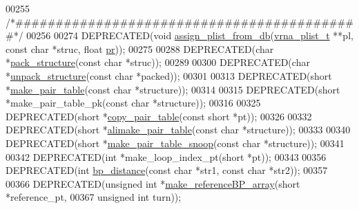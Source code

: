 \begin{DoxyCode}
00255 \textcolor{comment}{/*###########################################*/}
00256 
00274 DEPRECATED(\textcolor{keywordtype}{void} \hyperlink{group__struct__utils_ga6f3031d77de925a7b4ca72e1d52dec2f}{assign\_plist\_from\_db}(\hyperlink{group__data__structures_structvrna__plist__s}{vrna\_plist\_t} **pl, \textcolor{keyword}{const} \textcolor{keywordtype}{char} *struc, \textcolor{keywordtype}{
      float} \hyperlink{fold__vars_8h_ac98ec419070aee6831b44e5c700f090f}{pr}));
00275 
00288 DEPRECATED(\textcolor{keywordtype}{char} *\hyperlink{group__struct__utils_gac6dfa5e22928c087c6e09ff0054a7ced}{pack\_structure}(\textcolor{keyword}{const} \textcolor{keywordtype}{char} *struc));
00289 
00300 DEPRECATED(\textcolor{keywordtype}{char} *\hyperlink{group__struct__utils_ga071c6921efe1eb974f115ee6fefa3c39}{unpack\_structure}(\textcolor{keyword}{const} \textcolor{keywordtype}{char} *packed));
00301 
00313 DEPRECATED(\textcolor{keywordtype}{short} *\hyperlink{group__struct__utils_ga89c32307ee50a0026f4a3131fac0845a}{make\_pair\_table}(\textcolor{keyword}{const} \textcolor{keywordtype}{char} *structure));
00314 
00315 DEPRECATED(\textcolor{keywordtype}{short} *make\_pair\_table\_pk(\textcolor{keyword}{const} \textcolor{keywordtype}{char} *structure));
00316 
00325 DEPRECATED(\textcolor{keywordtype}{short} *\hyperlink{group__struct__utils_gafeaa6d68eef3a99d0a7aa08aa91c6601}{copy\_pair\_table}(\textcolor{keyword}{const} \textcolor{keywordtype}{short} *pt));
00326 
00332 DEPRECATED(\textcolor{keywordtype}{short} *\hyperlink{group__struct__utils_ga3c81b3967056c3888b8472b65fbb16f5}{alimake\_pair\_table}(\textcolor{keyword}{const} \textcolor{keywordtype}{char} *structure));
00333 
00340 DEPRECATED(\textcolor{keywordtype}{short} *\hyperlink{group__struct__utils_ga9aa3bf3b4346bb7fb88efc154dd07a79}{make\_pair\_table\_snoop}(\textcolor{keyword}{const} \textcolor{keywordtype}{char} *structure));
00341 
00342 DEPRECATED(\textcolor{keywordtype}{int} *make\_loop\_index\_pt(\textcolor{keywordtype}{short} *pt));
00343 
00356 DEPRECATED(\textcolor{keywordtype}{int} \hyperlink{group__struct__utils_ga6ebbcd29a754f0e4f1a66d1fd84184db}{bp\_distance}(\textcolor{keyword}{const} \textcolor{keywordtype}{char} *str1, \textcolor{keyword}{const} \textcolor{keywordtype}{char} *str2));
00357 
00366 DEPRECATED(\textcolor{keywordtype}{unsigned} \textcolor{keywordtype}{int}  *\hyperlink{group__struct__utils_ga578cd9712dee812fb1c58aa3cc489864}{make\_referenceBP\_array}(\textcolor{keywordtype}{short} *reference\_pt,
00367                                       \textcolor{keywordtype}{unsigned} \textcolor{keywordtype}{int} turn));

\end{DoxyCode}
